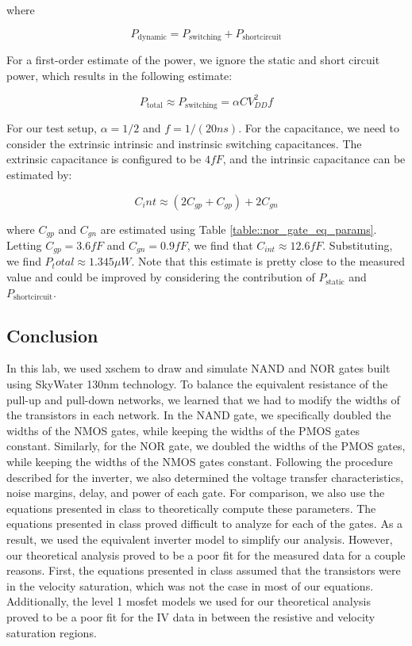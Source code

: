 \documentclass[fleqn]{article}
\begin{document}
	\noindent where
	
	\begin{equation}
		P_{\text{dynamic}} = P_{\text{switching}} +  P_{\text{shortcircuit}}
	\end{equation}
	
	\noindent For a first-order estimate of the power, we ignore the static and short circuit power, which results in the following estimate:
	
	\begin{equation}
		P_{\text{total}} \approx P_{\text{switching}} = \alpha CV_{DD}^2f
	\end{equation}
	
	\noindent For our test setup, $\alpha = 1/2$ and $f = 1/(20 ns)$. For the capacitance, we need to consider the extrinsic intrinsic and instrinsic switching capacitances. The extrinsic capacitance is configured to be $4 fF$, and the intrinsic capacitance can be estimated by:
	
	 \begin{equation}
	 	\label{eq::cint_est}
	 	C_int \approx (2C_{gp} + C_{gp}) + 2C_{gn}
	 \end{equation}
	 
	  \noindent where $C_{gp}$ and $C_{gn}$ are estimated using Table \ref{table::nor_gate_eq_params}. Letting $C_{gp} = 3.6 fF$ and $C_{gn} = 0.9 fF$, we find that $C_{int} \approx 12.6 fF$. Substituting, we find $P_total \approx 1.345 {\mu}W$. Note that this estimate is pretty close to the measured value and could be improved by considering the contribution of $P_{\text{static}}$ and $P_{\text{shortcircuit}}$.
	
	\subsection{Conclusion}
	
	In this lab, we used xschem to draw and simulate NAND and NOR gates built using SkyWater 130nm technology. To balance the equivalent resistance of the pull-up and pull-down networks, we learned that we had to modify the widths of the transistors in each network. In the NAND gate, we specifically doubled the widths of the NMOS gates, while keeping the widths of the PMOS gates constant. Similarly, for the NOR gate, we doubled the widths of the PMOS gates, while keeping the widths of the NMOS gates constant. Following the procedure described for the inverter, we also determined the voltage transfer characteristics, noise margins, delay, and power of each gate. For comparison, we also use the equations presented in class to theoretically compute these parameters. The equations presented in class proved difficult to analyze for each of the gates. As a result, we used the equivalent inverter model to simplify our analysis. However, our theoretical analysis proved to be a poor fit for the measured data for a couple reasons. First, the equations presented in class assumed that the transistors were in the velocity saturation, which was not the case in most of our equations. Additionally, the level 1 mosfet models we used for our theoretical analysis proved to be a poor fit for the IV data in between the resistive and velocity saturation regions.
	
\end{document}
